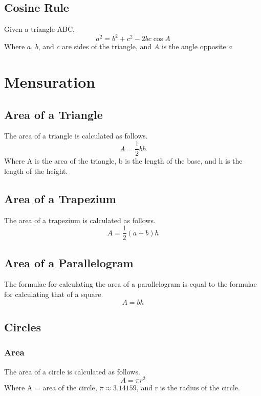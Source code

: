 \documentclass{report}
\begin{document}
\begin{flushleft}
\subsection{Cosine Rule}
Given a triangle ABC,
\begin{equation}
a^2 = b^2 + c^2 - 2bc\cos{A}
\end{equation}
Where $a$, $b$, and $c$ are sides of the triangle, and $A$ is the angle opposite $a$

\section{Mensuration}
\subsection{Area of a Triangle}
The area of a triangle is calculated as follows.
\begin{equation}
A=\frac{1}{2}bh
\end{equation}
Where A is the area of the triangle, b is the length of the base, and h is the length of the height.

\subsection{Area of a Trapezium}
The area of a trapezium is calculated as follows.
\begin{equation}
A=\frac{1}{2}\left(a+b\right)h
\end{equation}

\subsection{Area of a Parallelogram}
The formulae for calculating the area of a parallelogram is equal to the formulae for calculating that of a square.
\begin{equation}
A=bh
\end{equation}

\subsection{Circles}
\subsubsection{Area}
The area of a circle is calculated as follows.
\begin{equation}
A=\pi r^2
\end{equation}
Where A = area of the circle, $\pi\approx 3.14159$, and r is the radius of the circle.


\end{flushleft}
\end{document}
